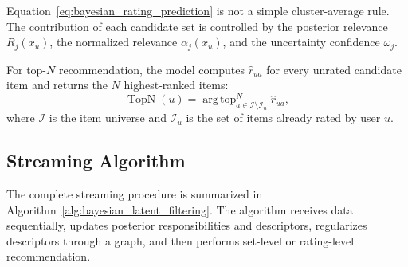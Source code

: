 \documentclass{article}
\theoremstyle{plain}
\theoremstyle{definition}
\theoremstyle{remark}
\begin{document}
Equation~\eqref{eq:bayesian_rating_prediction} is not a simple cluster-average rule. The contribution of each candidate set is controlled by the posterior relevance \(R_j(x_u)\), the normalized relevance \(\alpha_j(x_u)\), and the uncertainty confidence \(\omega_j\).

For top-\(N\) recommendation, the model computes \(\widehat r_{ua}\) for every unrated candidate item and returns the \(N\) highest-ranked items:
\begin{equation}
	\label{eq:topn_rule}
	\operatorname{TopN}(u)
	=
	\operatorname{arg\,top}_{a\in\mathcal I\setminus\mathcal I_u}^{N}
	\widehat r_{ua},
\end{equation}
where \(\mathcal I\) is the item universe and \(\mathcal I_u\) is the set of items already rated by user \(u\).

\subsection{Streaming Algorithm}
\label{subsec:streaming_algorithm}

The complete streaming procedure is summarized in Algorithm~\ref{alg:bayesian_latent_filtering}. The algorithm receives data sequentially, updates posterior responsibilities and descriptors, regularizes descriptors through a graph, and then performs set-level or rating-level recommendation.
\end{document}
